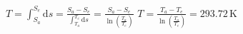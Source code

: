 \( T = \int_{S_a}^{S_e} \text{d}s = \frac{S_a - S_e}{\int_{T_a}^{T_e} \text{d}s} = \frac{S_a - S_e}{\ln \left( \frac{T_a}{T_e} \right)} \)  
\( T = \frac{T_a - T_e}{\ln \left( \frac{T_a}{T_e} \right)} = 293.72 \, \text{K} \)